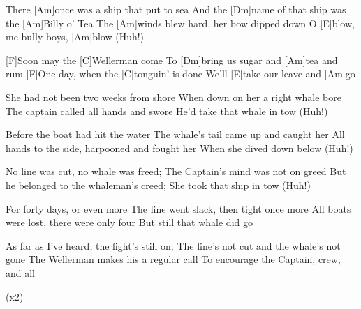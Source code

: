 

\begin{guitar}
	There [Am]once was a ship that put to sea
	And the [Dm]name of that ship was the [Am]Billy o' Tea
	The [Am]winds blew hard, her bow dipped down
	O [E]blow, me bully boys, [Am]blow (Huh!)
	
	[F]Soon may the [C]Wellerman come
	To [Dm]bring us sugar and [Am]tea and rum
	[F]One day, when the [C]tonguin' is done
	We'll [E]take our leave and [Am]go
	
	She had not been two weeks from shore
	When down on her a right whale bore
	The captain called all hands and swore
	He'd take that whale in tow (Huh!)
	
	 
	
	Before the boat had hit the water
	The whale's tail came up and caught her
	All hands to the side, harpooned and fought her
	When she dived down below (Huh!)
	
	 
	
	No line was cut, no whale was freed;
	The Captain's mind was not on greed
	But he belonged to the whaleman's creed;
	She took that ship in tow (Huh!)
	
	 
	
	\pagebreak
	
	For forty days, or even more
	The line went slack, then tight once more
	All boats were lost, there were only four
	But still that whale did go
	
	 
	
	As far as I've heard, the fight's still on;
	The line's not cut and the whale's not gone
	The Wellerman makes his a regular call
	To encourage the Captain, crew, and all
	
	  (x2)
\end{guitar}